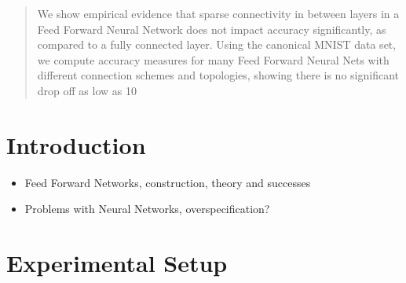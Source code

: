 \documentclass{article}
\begin{document}
 


\begin{abstract} 
We show empirical evidence that sparse connectivity in between layers in a Feed Forward Neural Network does not impact accuracy significantly, as compared to a fully connected layer. Using the canonical MNIST data set, we compute accuracy measures for many Feed Forward Neural Nets with different connection schemes and topologies, showing there is no significant drop off as low as 10%
\end{abstract} 

\section{Introduction}
\label{intro}

\begin{itemize}
\item Feed Forward Networks, construction, theory and successes \cite{lecun-98}
\item Problems with Neural Networks, overspecification?
\end{itemize}


\section{Experimental Setup}
\label{expriment}
\end{document}
